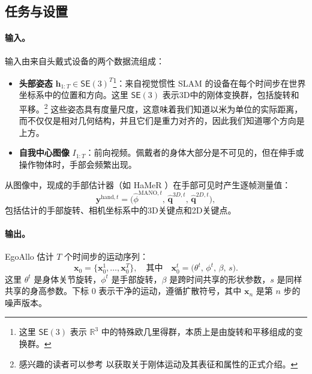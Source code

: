 \documentclass[../../book-main_zh.tex]{subfiles}
\begin{document}
\subsection{任务与设置}
\label{sub:egoallo_objective}

\paragraph{输入。}
输入由来自头戴式设备的两个数据流组成：
\begin{itemize}
    \item \textbf{头部姿态} $\boldsymbol{h}_{1:T} \in \mathsf{SE}(3)^T$\footnote{这里 $\mathsf{SE}(3)$ 表示 $\mathbb{R}^3$ 中的特殊欧几里得群，本质上是由旋转和平移组成的变换群。}：来自视觉惯性 SLAM 的设备在每个时间步在世界坐标系中的位置和方向。这里 $\mathsf{SE}(3)$ 表示3D中的刚体变换群，包括旋转和平移。\footnote{感兴趣的读者可以参考 \cite{MaY2003} 以获取关于刚体运动及其表征和属性的正式介绍。} 这些姿态具有度量尺度，这意味着我们知道以米为单位的实际距离，而不仅仅是相对几何结构，并且它们是重力对齐的，因此我们知道哪个方向是上方。
    \item \textbf{自我中心图像} $I_{1:T}$：前向视频。佩戴者的身体大部分是不可见的，但在伸手或操作物体时，手部会频繁出现。
\end{itemize}

从图像中，现成的手部估计器（如 HaMeR \citep{pavlakos2023hamer}）在手部可见时产生逐帧测量值：
\begin{equation}
    \boldsymbol{y}^{\text{hand},t} = \big(\hat{\phi}^{\text{MANO},t},\,
    \hat{\boldsymbol{q}}^{3D,t},\, \hat{\boldsymbol{q}}^{2D,t}\big),
\end{equation}
包括估计的手部旋转、相机坐标系中的3D关键点和2D关键点。

\paragraph{输出。}
EgoAllo 估计 $T$ 个时间步的运动序列：
\begin{equation}
    \boldsymbol{x}_0 = \{\boldsymbol{x}_0^{1}, \dots, \boldsymbol{x}_0^{T}\},
    \quad\text{其中}\quad
    \boldsymbol{x}_0^{t} = \big(\theta^t,\, \phi^t,\, \beta,\, s\big).
\end{equation}
这里 $\theta^t$ 是身体关节旋转，$\phi^t$ 是手部旋转，$\beta$ 是跨时间共享的形状参数，$s$ 是同样共享的身高参数。下标 $0$ 表示干净的运动，遵循扩散符号，其中 $\boldsymbol{x}_n$ 是第 $n$ 步的噪声版本。
\end{document}

